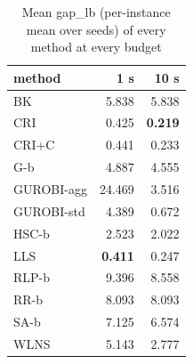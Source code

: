 \begin{table}[htbp]
\centering
\small
\caption{Mean gap\_lb (per-instance mean over seeds) of every method at every budget}
\label{tab:E4a_equal_budgets_gap_by_budget}
\begin{tabular}{lrr}
\toprule
method & 1 s & 10 s \\
\midrule
BK & 5.838 & 5.838 \\
CRI & 0.425 & \textbf{0.219} \\
CRI+C & 0.441 & 0.233 \\
G-b & 4.887 & 4.555 \\
GUROBI-agg & 24.469 & 3.516 \\
GUROBI-std & 4.389 & 0.672 \\
HSC-b & 2.523 & 2.022 \\
LLS & \textbf{0.411} & 0.247 \\
RLP-b & 9.396 & 8.558 \\
RR-b & 8.093 & 8.093 \\
SA-b & 7.125 & 6.574 \\
WLNS & 5.143 & 2.777 \\
\bottomrule
\end{tabular}
\end{table}
